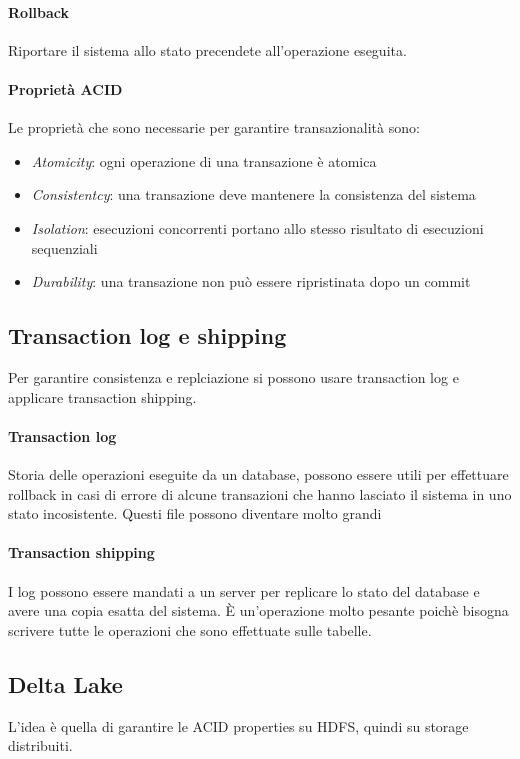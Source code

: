 \documentclass[a4paper]{article}
\begin{document}
\paragraph{Rollback}
Riportare il sistema allo stato precendete all'operazione eseguita.

\paragraph{Proprietà ACID}
Le proprietà che sono necessarie per garantire transazionalità sono:
\begin{itemize}
    \item \emph{Atomicity}: ogni operazione di una transazione è atomica
    \item \emph{Consistentcy}: una transazione deve mantenere la consistenza del sistema
    \item \emph{Isolation}: esecuzioni concorrenti portano allo stesso risultato di esecuzioni sequenziali
    \item \emph{Durability}: una transazione non può essere ripristinata dopo un commit
\end{itemize}

\subsection{Transaction log e shipping}
Per garantire consistenza e replciazione si possono usare transaction log e applicare
transaction shipping.

\paragraph{Transaction log} 
Storia delle operazioni eseguite da un database, possono essere utili per effettuare
rollback in casi di errore di alcune transazioni che hanno lasciato
il sistema in uno stato incosistente. Questi file possono diventare molto grandi

\paragraph{Transaction shipping}
I log possono essere mandati a un server per replicare lo stato del database e avere
una copia esatta del sistema. È un'operazione molto pesante poichè bisogna scrivere
tutte le operazioni che sono effettuate sulle tabelle.

\subsection{Delta Lake}
L'idea è quella di garantire le ACID properties su HDFS, quindi su 
storage distribuiti.
\end{document}
